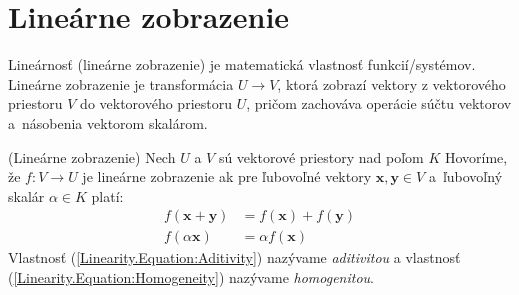 \documentclass[a4paper, 10pt, ]{article}
\begin{document}
\normalsize
\normalfont




\section{Lineárne zobrazenie}
\label{Linearity}

Lineárnosť (lineárne zobrazenie) je matematická vlastnosť funkcií/systémov. Lineárne zobrazenie je transformácia $U \rightarrow V$, ktorá zobrazí vektory z vektorového priestoru $V$ do vektorového priestoru $U$, pričom zachováva operácie súčtu vektorov a~násobenia vektorom skalárom.

\begin{definition}(Lineárne zobrazenie)
    Nech $U$ a $V$ sú vektorové priestory nad poľom $K$ Hovoríme, že $f: V \rightarrow U$ je lineárne zobrazenie ak pre ľubovoľné vektory $\bm{x}, \bm{y} \in V$ a~ľubovoľný skalár $\alpha \in K$ platí:
    \begin{subequations}
        \begin{align}
            \label{Linearity.Equation:Aditivity}
            f(\bm{x} + \bm{y}) &= f(\bm{x}) + f(\bm{y}) \\[6pt]
            \label{Linearity.Equation:Homogeneity}
            f(\alpha \bm{x})   &= \alpha f(\bm{x})
        \end{align}
    \end{subequations}
    Vlastnosť (\ref{Linearity.Equation:Aditivity}) nazývame \textit{aditivitou} a vlastnosť (\ref{Linearity.Equation:Homogeneity}) nazývame \textit{homogenitou}.
\end{definition}
\end{document}
